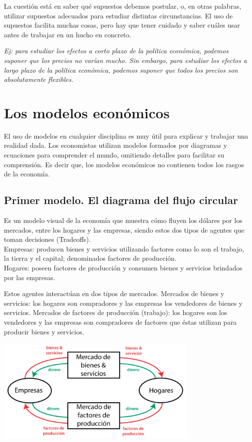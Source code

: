 \documentclass{report}
\begin{document}
La cuestión está en saber qué supuestos debemos postular, o, en otras palabras, utilizar supuestos adecuados para estudiar distintas circunstancias. El uso de supuestos facilita muchas cosas, pero hay que tener cuidado y saber cuáles usar antes de trabajar en un hucho en concreto.

\textit{\footnotesize Ej: para estudiar los efectos a corto plazo de la política económica, podemos suponer que los precios no varían mucho. Sin embargo, para estudiar los efectos a largo plazo de la política económica, podemos suponer que todos los precios son absolutamente flexibles.}

\section{Los modelos económicos}

El uso de modelos en cualquier disciplina es muy útil para explicar y trabajar una realidad dada. Los economistas utilizan modelos formados por diagramas y ecuaciones para comprender el mundo, omitiendo detalles para facilitar su comprensión. Es decir que, los modelos económicos no contienen todos los rasgos de la economía.

\subsection{Primer modelo. El diagrama del flujo circular}
Es un modelo visual de la economía que muestra cómo fluyen los dólares por los mercados, entre los hogares y las empresas, siendo estos dos tipos de agentes que toman decisiones (Tradeoffs). \\
Empresas: producen bienes y servicios utilizando factores como lo son el trabajo, la tierra y el capital; denominados factores de producción. \\
Hogares: poseen factores de producción y consumen bienes y servicios brindados por las empresas.

Estos agentes interactúan en dos tipos de mercados.
Mercados de bienes y servicios: los hogares son compradores y las empresas los vendedores de bienes y servicios.
Mercados de factores de producción (trabajo): los hogares son los vendedores y las empresas son compradores de factores que éstas utilizan para producir bienes y servicios.

\includegraphics[width=10cm]{../Assets/mercados_economia.png}
\end{document}
